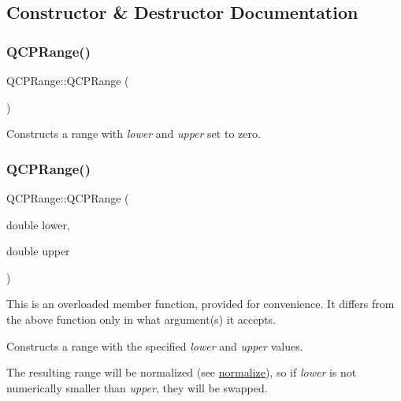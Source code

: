 \subsection{Constructor \& Destructor Documentation}
\mbox{\label{class_q_c_p_range_aca158d7e69702cee5d77d10a269b01e2}} 
\subsubsection{\texorpdfstring{Q\+C\+P\+Range()}{QCPRange()}\hspace{0.1cm}{\footnotesize\ttfamily [1/2]}}
{\footnotesize\ttfamily Q\+C\+P\+Range\+::\+Q\+C\+P\+Range (\begin{DoxyParamCaption}{ }\end{DoxyParamCaption})}

Constructs a range with {\itshape lower} and {\itshape upper} set to zero. \mbox{\label{class_q_c_p_range_a1d9d84d084c8f368fdedd42e0978d405}} 
\subsubsection{\texorpdfstring{Q\+C\+P\+Range()}{QCPRange()}\hspace{0.1cm}{\footnotesize\ttfamily [2/2]}}
{\footnotesize\ttfamily Q\+C\+P\+Range\+::\+Q\+C\+P\+Range (\begin{DoxyParamCaption}\item[{double}]{lower,  }\item[{double}]{upper }\end{DoxyParamCaption})}

This is an overloaded member function, provided for convenience. It differs from the above function only in what argument(s) it accepts.

Constructs a range with the specified {\itshape lower} and {\itshape upper} values.

The resulting range will be normalized (see \hyperlink{class_q_c_p_range_af914a7740269b0604d0827c634a878a9}{normalize}), so if {\itshape lower} is not numerically smaller than {\itshape upper}, they will be swapped. 

